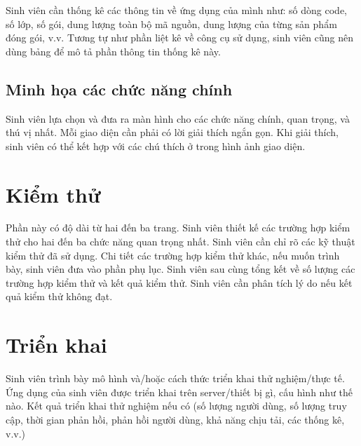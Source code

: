 \documentclass[../DoAn.tex]{subfiles}
\begin{document}
Sinh viên cần thống kê các thông tin về ứng dụng của mình như: số dòng code, số lớp, số gói, dung lượng toàn bộ mã nguồn, dung lượng của từng sản phẩm đóng gói, v.v. Tương tự như phần liệt kê về công cụ sử dụng, sinh viên cũng nên dùng bảng để mô tả phần thông tin thống kê này.

\subsection{Minh họa các chức năng chính}
Sinh viên lựa chọn và đưa ra màn hình cho các chức năng chính, quan trọng, và thú vị nhất. Mỗi giao diện cần phải có lời giải thích ngắn gọn. Khi giải thích, sinh viên có thể kết hợp với các chú thích ở trong hình ảnh giao diện.

\section{Kiểm thử}
Phần này có độ dài từ hai đến ba trang. Sinh viên thiết kế các trường hợp kiểm thử cho hai đến ba chức năng quan trọng nhất. Sinh viên cần chỉ rõ các kỹ thuật kiểm thử đã sử dụng. Chi tiết các trường hợp kiểm thử khác, nếu muốn trình bày, sinh viên đưa vào phần phụ lục.
Sinh viên sau cùng tổng kết về số lượng các trường hợp kiểm thử và kết quả kiểm thử. Sinh viên cần phân tích lý do nếu kết quả kiểm thử không đạt.
\section{Triển khai}
Sinh viên trình bày mô hình và/hoặc cách thức triển khai thử nghiệm/thực tế. Ứng dụng của sinh viên được triển khai trên server/thiết bị gì, cấu hình như thế nào. Kết quả triển khai thử nghiệm nếu có (số lượng người dùng, số lượng truy cập, thời gian phản hồi, phản hồi người dùng, khả năng chịu tải, các thống kê, v.v.)
\end{document}
